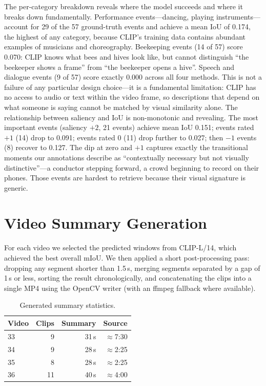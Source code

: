 \documentclass[sigconf, nonacm]{acmart}
\begin{document}
The per-category breakdown reveals where the model succeeds and where it
breaks down fundamentally. Performance events---dancing, playing
instruments---account for 29 of the 57 ground-truth events and achieve a
mean IoU of 0.174, the highest of any category, because CLIP's training
data contains abundant examples of musicians and choreography. Beekeeping
events (14 of 57) score 0.070: CLIP knows what bees and hives look like,
but cannot distinguish ``the beekeeper shows a frame'' from ``the beekeeper
opens a hive''. Speech and dialogue events (9 of 57) score exactly 0.000
across all four methods. This is not a failure of any particular design
choice---it is a fundamental limitation: CLIP has no access to audio or
text within the video frame, so descriptions that depend on what someone
is saying cannot be matched by visual similarity alone. The relationship
between saliency and IoU is non-monotonic and revealing. The most important
events (saliency $+2$, 21 events) achieve mean IoU 0.151; events rated
$+1$ (14) drop to 0.091; events rated 0 (11) drop further to 0.027;
then $-1$ events (8) recover to 0.127. The dip at zero and $+1$ captures
exactly the transitional moments our annotations describe as ``contextually
necessary but not visually distinctive''---a conductor stepping forward, a
crowd beginning to record on their phones. Those events are hardest to
retrieve because their visual signature is generic.

\section{Video Summary Generation}
\label{sec:summary}

For each video we selected the predicted windows from CLIP-L/14, which
achieved the best overall mIoU. We then applied a short post-processing
pass: dropping any segment shorter than 1.5\,s, merging segments separated
by a gap of 1\,s or less, sorting the result chronologically, and
concatenating the clips into a single MP4 using the OpenCV writer (with an
ffmpeg fallback where available).

\begin{table}[h]
  \centering
  \caption{Generated summary statistics.}
  \label{tab:summaries}
  \begin{tabular}{lrrr}
    \toprule
    Video & Clips & Summary & Source \\
    \midrule
    33 &  9 & 31\,s & ${\approx}$7:30 \\
    34 &  9 & 28\,s & ${\approx}$2:25 \\
    35 &  8 & 28\,s & ${\approx}$2:25 \\
    36 & 11 & 40\,s & ${\approx}$4:00 \\
    \bottomrule
  \end{tabular}
\end{table}
\end{document}
